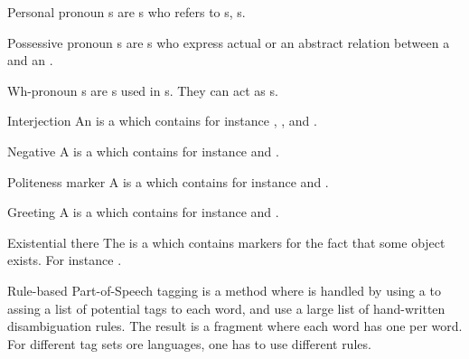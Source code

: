 \begin{df}{Personal pronoun}
\sb{}s are s who refers to s, s.
\end{df}
\begin{df}{Possessive pronoun}
\sb{}s are s who express actual  or an abstract relation between a  and an .
\end{df}
\begin{df}{Wh-pronoun}
\sb{}s are s used in s. They can act as s.
\end{df}
\begin{df}{Interjection}
An \sb{} is a  which contains for instance , ,  and .
\end{df}
\begin{df}{Negative}
A \sb{} is a  which contains for instance  and .
\end{df}
\begin{df}{Politeness marker}
A \sb{} is a  which contains for instance  and .
\end{df}
\begin{df}{Greeting}
A \sb{} is a  which contains for instance  and .
\end{df}
\begin{df}{Existential there}
The \sb{} is a  which contains markers for the fact that some object exists. For instance .
\end{df}
\begin{df}{Rule-based Part-of-Speech tagging}
\sb{} is a method where  is handled by using a  to assing a list of potential tags to each word, and use a large list of hand-written disambiguation rules. The result is a fragment where each word has one  per word. For different tag sets ore languages, one has to use different rules.
\end{df}